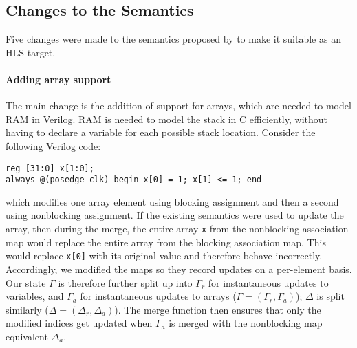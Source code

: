 \subsection{Changes to the Semantics}

Five changes were made to the semantics proposed by \textcite{loow19_proof_trans_veril_devel_hol} to make it suitable as an HLS target.

\paragraph{Adding array support}
The main change is the addition of support for arrays, which are needed to model RAM in Verilog.  RAM is needed to model the stack in C efficiently, without having to declare a variable for each possible stack location. %
Consider the following Verilog code:

\begin{center}
\begin{verbatim}
reg [31:0] x[1:0];
always @(posedge clk) begin x[0] = 1; x[1] <= 1; end
\end{verbatim}
\end{center}

which modifies one array element using blocking assignment and then a second using nonblocking assignment. If the existing semantics were used to update the array, then during the merge, the entire array \texttt{x} from the nonblocking association map would replace the entire array from the blocking association map.  This would replace \texttt{x[0]} with its original value and therefore behave incorrectly. Accordingly, we modified the maps so they record updates on a per-el\-em\-ent basis. Our state $\Gamma$ is therefore further split up into $\Gamma_{r}$ for instantaneous updates to variables, and $\Gamma_{a}$ for instantaneous updates to arrays ($\Gamma = (\Gamma_{r}, \Gamma_{a})$); $\Delta$ is split similarly ($\Delta = (\Delta_{r}, \Delta_{a})$). The merge function then ensures that only the modified indices get updated when $\Gamma_{a}$ is merged with the nonblocking map equivalent $\Delta_{a}$.

